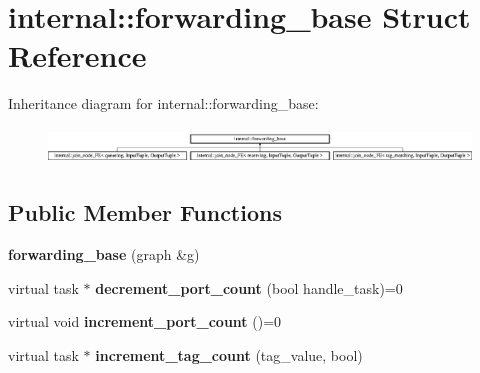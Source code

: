 \hypertarget{structinternal_1_1forwarding__base}{}\section{internal\+:\+:forwarding\+\_\+base Struct Reference}
\label{structinternal_1_1forwarding__base}
Inheritance diagram for internal\+:\+:forwarding\+\_\+base\+:\begin{figure}[H]
\begin{center}
\leavevmode
\includegraphics[height=0.962199cm]{structinternal_1_1forwarding__base}
\end{center}
\end{figure}
\subsection*{Public Member Functions}
\begin{DoxyCompactItemize}
\item 
\hypertarget{structinternal_1_1forwarding__base_ae62a648f3b75702457766b956ef42e52}{}{\bfseries forwarding\+\_\+base} (graph \&g)\label{structinternal_1_1forwarding__base_ae62a648f3b75702457766b956ef42e52}

\item 
\hypertarget{structinternal_1_1forwarding__base_a7eb37238aa85eca491dc651d7c5c61f6}{}virtual task $\ast$ {\bfseries decrement\+\_\+port\+\_\+count} (bool handle\+\_\+task)=0\label{structinternal_1_1forwarding__base_a7eb37238aa85eca491dc651d7c5c61f6}

\item 
\hypertarget{structinternal_1_1forwarding__base_a1a5679161de0ef20d62f91654c712bf3}{}virtual void {\bfseries increment\+\_\+port\+\_\+count} ()=0\label{structinternal_1_1forwarding__base_a1a5679161de0ef20d62f91654c712bf3}

\item 
\hypertarget{structinternal_1_1forwarding__base_a43eb3a7f519b0afe9ffdc6ab07bee880}{}virtual task $\ast$ {\bfseries increment\+\_\+tag\+\_\+count} (tag\+\_\+value, bool)\label{structinternal_1_1forwarding__base_a43eb3a7f519b0afe9ffdc6ab07bee880}

\end{DoxyCompactItemize}

